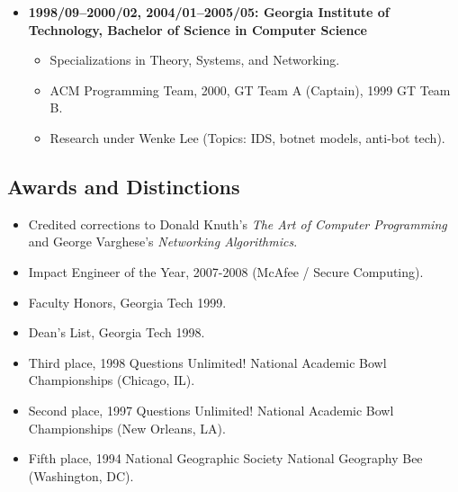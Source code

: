 \documentclass{article}
\newenvironment{tightitemize}
{\begin{itemize}
  \setlength{\itemsep}{1pt}
  \setlength{\parskip}{0pt}
  \setlength{\parsep}{0pt}}
{\end{itemize}}
\begin{document}
\begin{tightitemize}
\item \textbf{1998/09--2000/02, 2004/01--2005/05: Georgia Institute of Technology,
Bachelor of Science in Computer Science}
\begin{tightitemize}
\item Specializations in Theory, Systems, and Networking.
\item ACM Programming Team, 2000, GT Team A (Captain), 1999 GT Team B.
\item Research under Wenke Lee (Topics: IDS, botnet models, anti-bot tech).
\end{tightitemize}
\end{tightitemize}

\vspace{2mm}
\subsection*{Awards and Distinctions}
\begin{tightitemize}
\item Credited corrections to Donald Knuth's \textit{The Art of Computer Programming}
   and George Varghese's \textit{Networking Algorithmics}.
\item Impact Engineer of the Year, 2007-2008 (McAfee / Secure Computing).
\item Faculty Honors, Georgia Tech 1999.
\item Dean's List, Georgia Tech 1998.
\item Third place, 1998 Questions Unlimited! National Academic Bowl Championships (Chicago, IL).
\item Second place, 1997 Questions Unlimited! National Academic Bowl Championships (New Orleans, LA).
\item Fifth place, 1994 National Geographic Society National Geography Bee (Washington, DC).
\end{tightitemize}

\vspace{2mm}
\end{document}
